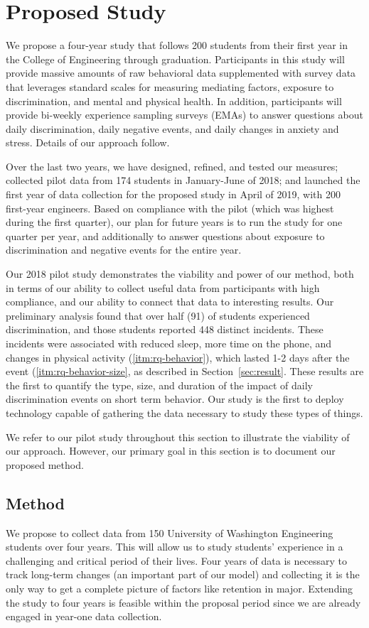 \section{Proposed Study}
\label{sec:study}
\noindent We propose a four-year study that follows 200 students from their first year in the College of Engineering through graduation. Participants in this study will provide massive amounts of raw behavioral data supplemented with survey data that leverages standard scales for measuring mediating factors, exposure to discrimination, and mental and physical health. In addition, participants will provide bi-weekly experience sampling surveys  (EMAs) to answer questions about daily discrimination, daily negative events, and daily changes in anxiety and stress. Details of our approach  follow.

Over the last two years, we have designed, refined, and tested our measures; collected pilot data from 174 students in January-June of 2018; and launched the first year of data collection for the proposed study in April of 2019, with 200 first-year engineers.  Based on compliance with the pilot (which was highest during the first quarter), our plan for future years is to run the study for one quarter per year, and additionally to answer questions about exposure to discrimination and negative events for the entire year.  

Our 2018 pilot study demonstrates the viability and power of our method, both in terms of our ability to collect useful data from participants with high compliance, and our ability to connect that data to interesting results. Our preliminary analysis found that over half (91) of students experienced discrimination, and those students reported 448 distinct incidents. These incidents were associated with reduced sleep, more time on the phone, and changes in physical activity (\ref{itm:rq-behavior}), which lasted 1-2 days after the event (\ref{itm:rq-behavior-size}, as described in Section~\ref{sec:result}. These results are the first to quantify the type, size, and duration of the impact of daily discrimination events on short term behavior. Our study is the first to deploy technology capable of gathering the data necessary to study these types of things.  

We refer to our pilot study throughout this section to illustrate the viability of our approach. However, our primary goal in this section is to document our proposed method. 

\subsection{Method}
\noindent
We propose to collect data from 150 University of Washington Engineering students over four years. This will allow us to study students' experience in a challenging and critical period of their lives. Four years of data is necessary to track long-term changes (an important part of our model) and collecting it is the only way to get a complete picture of factors like retention in major.
Extending the study to four years is feasible within the proposal period  since we are already engaged in year-one data collection.

